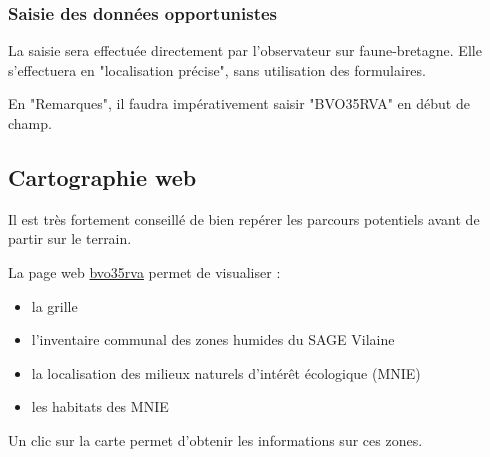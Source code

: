 \subsubsection*{Saisie des données opportunistes}
La saisie sera effectuée directement par l'observateur sur faune-bretagne.
Elle s'effectuera en "localisation précise", sans utilisation des formulaires.

En "Remarques", il faudra impérativement saisir "BVO35RVA" en début de champ.



\subsection*{Cartographie web}
Il est très fortement conseillé de bien repérer les parcours potentiels avant de partir sur le terrain.

La page web \href{http://bretagne-vivante-dev.org/bvo35rva}{bvo35rva} permet de visualiser :
\begin{itemize}
\item la grille
\item l'inventaire communal des zones humides du SAGE Vilaine
\item la localisation des milieux naturels d'intérêt écologique (MNIE)
\item les habitats des MNIE
\end{itemize}
Un clic sur la carte permet d'obtenir les informations sur ces zones.



